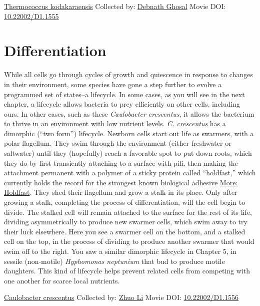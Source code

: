 \documentclass[]{tufte-book}
\begin{document}
\hypertarget{htmlwidget-ba2ece786f79470e7192}{}

\label{fig:8-3}\protect\hyperlink{tree}{Thermococcus kodakaraensis} Collected by: \protect\hyperlink{debnath_ghosal}{Debnath Ghosal} Movie DOI: \href{https://doi.org/10.22002/D1.1555}{10.22002/D1.1555}

\hypertarget{differentiation}{%
\section{Differentiation}\label{differentiation}}

While all cells go through cycles of growth and quiescence in response to changes in their environment, some species have gone a step further to evolve a programmed set of states--a lifecycle. In some cases, as you will see in the next chapter, a lifecycle allows bacteria to prey efficiently on other cells, including ours. In other cases, such as these \emph{Caulobacter crescentus}, it allows the bacterium to thrive in an environment with low nutrient levels. \emph{C. crescentus} has a dimorphic (``two form'') lifecycle. Newborn cells start out life as swarmers, with a polar flagellum. They swim through the environment (either freshwater or saltwater) until they (hopefully) reach a favorable spot to put down roots, which they do by first transiently attaching to a surface with pili, then making the attachment permanent with a polymer of a sticky protein called ``holdfast,'' which currently holds the record for the strongest known biological adhesive \protect\hyperlink{Holdfast}{More: Holdfast}. They shed their flagellum and grow a stalk in its place. Only after growing a stalk, completing the process of differentiation, will the cell begin to divide. The stalked cell will remain attached to the surface for the rest of its life, dividing asymmetrically to produce new swarmer cells, which swim away to try their luck elsewhere. Here you see a swarmer cell on the bottom, and a stalked cell on the top, in the process of dividing to produce another swarmer that would swim off to the right. You saw a similar dimorphic lifecycle in Chapter 5, in sessile (non-motile) \emph{Hyphomonas neptunium} that bud to produce motile daughters. This kind of lifecycle helps prevent related cells from competing with one another for scarce local nutrients.



\hypertarget{htmlwidget-9b3a32005bf734f7cb62}{}

\label{fig:8-4}\protect\hyperlink{tree}{Caulobacter crescentus} Collected by: \protect\hyperlink{zhuo_li}{Zhuo Li} Movie DOI: \href{https://doi.org/10.22002/D1.1556}{10.22002/D1.1556}
\end{document}
